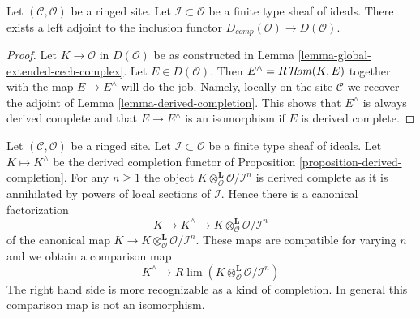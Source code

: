 \begin{proposition}
\label{proposition-derived-completion}
Let $(\mathcal{C}, \mathcal{O})$ be a ringed site.
Let $\mathcal{I} \subset \mathcal{O}$ be a finite type sheaf of
ideals. There exists a left adjoint to the inclusion
functor $D_{comp}(\mathcal{O}) \to D(\mathcal{O})$.
\end{proposition}

\begin{proof}
Let $K \to \mathcal{O}$ in $D(\mathcal{O})$ be as constructed in
Lemma \ref{lemma-global-extended-cech-complex}. Let $E \in D(\mathcal{O})$.
Then $E^\wedge = R\mathop{\mathcal{H}\!\mathit{om}}\nolimits(K, E)$ together with the map $E \to E^\wedge$
will do the job. Namely, locally on the site $\mathcal{C}$ we
recover the adjoint of Lemma \ref{lemma-derived-completion}.
This shows that $E^\wedge$ is always derived complete and that
$E \to E^\wedge$ is an isomorphism if $E$ is derived complete.
\end{proof}

\begin{remark}
\label{remark-compare-with-completion}
Let $(\mathcal{C}, \mathcal{O})$ be a ringed site.
Let $\mathcal{I} \subset \mathcal{O}$ be a finite type sheaf of
ideals. Let $K \mapsto K^\wedge$ be the derived completion functor
of Proposition \ref{proposition-derived-completion}.
For any $n \geq 1$ the object
$K \otimes_\mathcal{O}^\mathbf{L} \mathcal{O}/\mathcal{I}^n$
is derived complete as it is annihilated by powers of
local sections of $\mathcal{I}$. Hence there is a canonical factorization
$$
K \to K^\wedge \to K \otimes_\mathcal{O}^\mathbf{L} \mathcal{O}/\mathcal{I}^n
$$
of the canonical map
$K \to K \otimes_\mathcal{O}^\mathbf{L} \mathcal{O}/\mathcal{I}^n$.
These maps are compatible for varying $n$ and we obtain a comparison map
$$
K^\wedge
\longrightarrow
R\lim \left(K \otimes_\mathcal{O}^\mathbf{L} \mathcal{O}/\mathcal{I}^n\right)
$$
The right hand side is more recognizable as a kind of completion.
In general this comparison map is not an isomorphism.
\end{remark}

